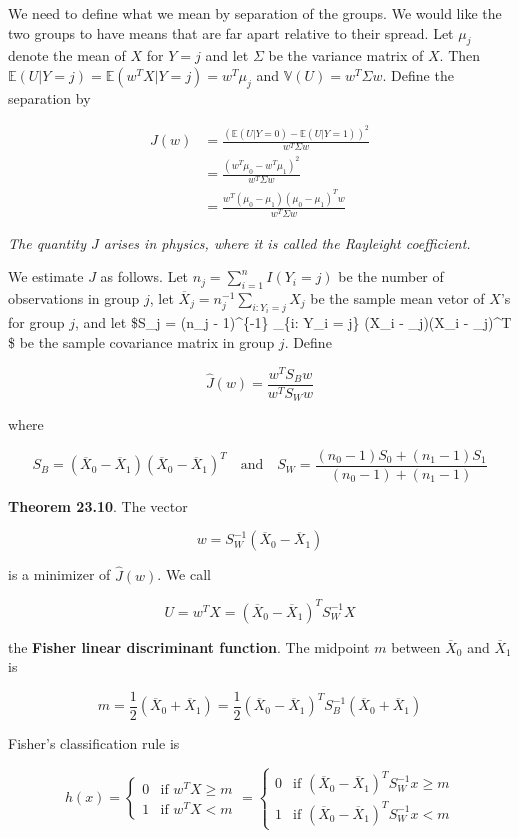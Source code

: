 We need to define what we mean by separation of the groups. We would
like the two groups to have means that are far apart relative to their
spread. Let \(\mu_j\) denote the mean of \(X\) for \(Y = j\) and let
\(\Sigma\) be the variance matrix of \(X\). Then
\(\mathbb{E}(U | Y = j) = \mathbb{E}(w^T X | Y = j) = w^T \mu_j\) and
\(\mathbb{V}(U) = w^T \Sigma w\). Define the separation by

\[
\begin{align}
J(w) &= \frac{(\mathbb{E}(U | Y = 0) - \mathbb{E}(U | Y = 1))^2}{w^T \Sigma w} \\
&= \frac{(w^T \mu_0 - w^T \mu_1)^2}{w^T \Sigma w} \\
&= \frac{w^T (\mu_0 - \mu_1)(\mu_0 - \mu_1)^T w}{w^T \Sigma w}
\end{align}
\]

\emph{The quantity \(J\) arises in physics, where it is called the
Rayleight coefficient.}

We estimate \(J\) as follows. Let \(n_j = \sum_{i=1}^n I(Y_i = j)\) be
the number of observations in group \(j\), let
\(\overline{X}_j = n_j^{-1} \sum_{i: Y_i = j} X_j\) be the sample mean
vetor of \(X\)'s for group \(j\), and let \$S\_j = (n\_j - 1)\^{}\{-1\}
\sum\_\{i: Y\_i = j\} (X\_i - \_j)(X\_i -
\_j)\^{}T \$ be the sample covariance matrix in group \(j\).
Define

\[ \hat{J}(w) = \frac{w^T S_B w}{w^T S_W w} \]

where

\[ 
S_B = (\overline{X}_0 - \overline{X}_1) (\overline{X}_0 - \overline{X}_1)^T
\quad \text{and} \quad
S_W = \frac{(n_0 - 1) S_0 + (n_1 - 1) S_1}{(n_0 - 1) + (n_1 -1)}
\]

\textbf{Theorem 23.10}. The vector

\[ w = S_W^{-1}(\overline{X}_0 - \overline{X}_1) \]

is a minimizer of \(\hat{J}(w)\). We call

\[ U = w^T X = (\overline{X}_0 - \overline{X}_1)^T S_W^{-1} X \]

the \textbf{Fisher linear discriminant function}. The midpoint \(m\)
between \(\overline{X}_0\) and \(\overline{X}_1\) is

\[ m = \frac{1}{2} (\overline{X}_0 + \overline{X}_1) = \frac{1}{2}  (\overline{X}_0 - \overline{X}_1)^T S_B^{-1}  (\overline{X}_0 + \overline{X}_1)\]

Fisher's classification rule is

\[
h(x) = \begin{cases}
0 & \text{if } w^T X \geq m \\
1 & \text{if } w^T X < m
\end{cases}
= \begin{cases}
0 & \text{if } (\overline{X}_0 - \overline{X}_1)^T S_W^{-1}x \geq m \\
1 & \text{if } (\overline{X}_0 - \overline{X}_1)^T S_W^{-1}x < m
\end{cases}
\]

